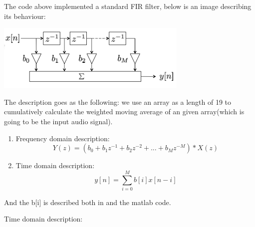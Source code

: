 \documentclass[11pt]{scrartcl}
\begin{document}
The code above implemented a standard FIR filter, below is an image describing its behaviour:

\begin{center}
\begin{minipage}[t]{\linewidth}

{
\includegraphics[scale = 1]{fir.png}
}
\end{minipage}
\medskip
\end{center}

The description goes as the following: we use an array as a length of 19 to cumulatively calculate the weighted moving average of an given array(which is going to be the input audio signal).\\


\begin{enumerate}
  \item Frequency domain description:
    $$Y(z) = (b_0 + b_1z^{-1} + b_2z^{-2} + ... +b_Mz^{-M})*X(z)$$

  \item Time domain description:
  $$y[n] = \sum^{M}_{i=0}b[i]x[n-i]$$
\end{enumerate}

And the b[i] is described both in \cite{table} and the matlab code.


Time domain description:



\end{document}
